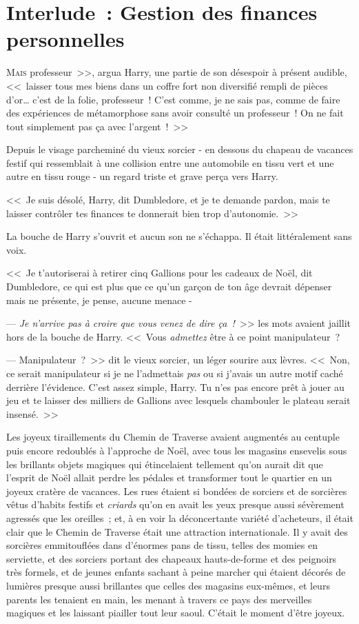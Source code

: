 \chapter{Interlude~: Gestion des finances personnelles}

\lettrine[ante=<<~]{M}{ais} professeur~>>, argua Harry, une partie de son désespoir à présent audible, <<~laisser tous mes biens dans un coffre fort non diversifié rempli de pièces d'or… c'est de la folie, professeur~! C'est comme, je ne sais pas, comme de faire des expériences de métamorphose sans avoir consulté un professeur~! On ne fait tout simplement pas ça avec l'argent~!~>>

Depuis le visage parcheminé du vieux sorcier - en dessous du chapeau de vacances festif qui ressemblait à une collision entre une automobile en tissu vert et une autre en tissu rouge - un regard triste et grave perça vers Harry.

<<~Je suis désolé, Harry, dit Dumbledore, et je te demande pardon, mais te laisser contrôler tes finances te donnerait bien trop d'autonomie.~>>

La bouche de Harry s'ouvrit et aucun son ne s'échappa. Il était littéralement sans voix.

<<~Je t'autoriserai à retirer cinq Gallions pour les cadeaux de Noël, dit Dumbledore, ce qui est plus que ce qu'un garçon de ton âge devrait dépenser mais ne présente, je pense, aucune menace -

--- \emph{Je n'arrive pas à croire que vous venez de dire ça~!}~>> les mots avaient jaillit hors de la bouche de Harry. <<~Vous \emph{admettez} être à ce point manipulateur~?

--- Manipulateur~?~>> dit le vieux sorcier, un léger sourire aux lèvres. <<~Non, ce serait manipulateur si je ne l'admettais \emph{pas} ou si j'avais un autre motif caché derrière l'évidence. C'est assez simple, Harry. Tu n'es pas encore prêt à jouer au jeu et te laisser des milliers de Gallions avec lesquels chambouler le plateau serait insensé.~>>

\later

Les joyeux tiraillements du Chemin de Traverse avaient augmentés au centuple puis encore redoublés à l'approche de Noël, avec tous les magasins ensevelis sous les brillants objets magiques qui étincelaient tellement qu'on aurait dit que l'esprit de Noël allait perdre les pédales et transformer tout le quartier en un joyeux cratère de vacances. Les rues étaient si bondées de sorciers et de sorcières vêtus d'habits festifs et \emph{criards} qu'on en avait les yeux presque aussi sévèrement agressés que les oreilles~; et, à en voir la déconcertante variété d'acheteurs, il était clair que le Chemin de Traverse était une attraction internationale. Il y avait des sorcières emmitouflées dans d'énormes pans de tissu, telles des momies en serviette, et des sorciers portant des chapeaux hauts-de-forme et des peignoirs très formels, et de jeunes enfants sachant à peine marcher qui étaient décorés de lumières presque aussi brillantes que celles des magasins eux-mêmes, et leurs parents les tenaient en main, les menant à travers ce pays des merveilles magiques et les laissant piailler tout leur saoul. C'était le moment d'être joyeux.

